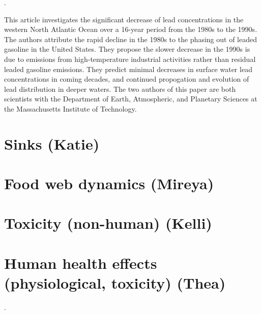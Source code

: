 \documentclass{article}\usepackage[]{graphicx}\usepackage[]{color}
\begin{document}
\noindent {} .


This article investigates the significant decrease of lead concentrations in the western North Atlantic Ocean over a 16-year period from the 1980s to the 1990s. The authors attribute the rapid decline in the 1980s to the phasing out of leaded gasoline in the United States. They propose the slower decrease in the 1990s is due to emissions from high-temperature industrial activities rather than residual leaded gasoline emissions. They predict minimal decreases in surface water lead concentrations in coming decades, and continued propogation and evolution of lead distribution in deeper waters. The two authors of this paper are both scientists with the Department of Earth, Atmospheric, and Planetary Sciences at the Massachusetts Institute of Technology.


\section{Sinks (Katie)}

\section{Food web dynamics (Mireya)}

\section{Toxicity (non-human) (Kelli)}

\section{Human health effects (physiological, toxicity) (Thea)}

. 
\bigskip
\end{document}

